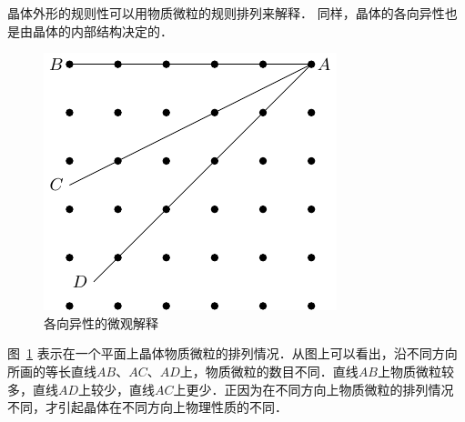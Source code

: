 晶体外形的规则性可以用物质微粒的规则排列来解释．
同样，晶体的各向异性也是由晶体的内部结构决定的．
\begin{figure}[htbp]
    \centering
    \includegraphics{fig/B/4-5.pdf}
    \caption{各向异性的微观解释}\label{fig_B_4-5}
\end{figure}

图~\ref{fig_B_4-5} 表示在一个平面上晶体物质微粒的排列情况．从图上可以看出，沿不同方向所画的等长直线$AB$、$AC$、$AD$上，物质微粒的数目不同．直线$AB$上物质微粒较多，直线$AD$上较少，直线$AC$上更少．正因为在不同方向上物质微粒的排列情况不同，才引起晶体在不同方向上物理性质的不同．

